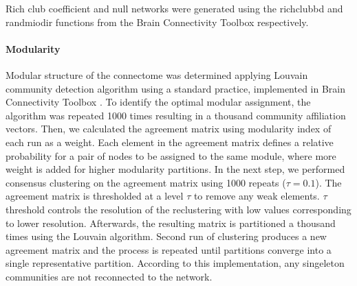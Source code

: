 \documentclass[10pt,letterpaper]{article}
\begin{document}
Rich club coefficient and null networks were generated using the rich\textunderscore club\textunderscore bd and randmio\textunderscore dir functions from the Brain Connectivity Toolbox \cite{Rubinov2010} respectively.


\paragraph{Modularity}
Modular structure of the connectome was determined applying Louvain community detection algorithm using a standard practice, implemented in Brain Connectivity Toolbox \cite{Rubinov2010}.
To identify the optimal modular assignment, the algorithm was repeated 1000 times resulting in a thousand community affiliation vectors.
Then, we calculated the agreement matrix using modularity index of each run as a weight.
Each element in the agreement matrix defines a relative probability for a pair of nodes to be assigned to the same module, where more weight is added for higher modularity partitions.
In the next step, we performed consensus clustering on the agreement matrix using 1000 repeats ($\tau=0.1$).
The agreement matrix is thresholded at a level $\tau$ to remove any weak elements.
$\tau$ threshold controls the resolution of the reclustering with low values corresponding to lower resolution.
Afterwards, the resulting matrix is partitioned a thousand times using the Louvain algorithm.
Second run of clustering produces a new agreement matrix and the process is repeated until partitions converge into a single representative partition.
According to this implementation, any singeleton communities are not reconnected to the network.


\end{document}
